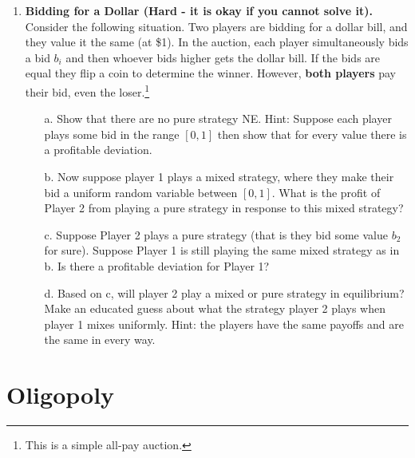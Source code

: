 \documentclass{article}
\begin{document}
\begin{enumerate}
\begin{enumerate}
        \vspace{4cm}
        
    \end{enumerate}
  \item \textbf{Bidding for a Dollar (Hard - it is okay if you cannot solve it).} Consider the following situation. Two players are bidding for a dollar bill, and they value it the same (at \$1). In the auction, each player simultaneously bids a bid $b_i$ and then whoever bids higher gets the dollar bill. If the bids are equal they flip a coin to determine the winner. However, \textbf{both players} pay their bid, even the loser.\footnote{This is a simple all-pay auction.}
  \begin{enumerate}
      \item[a.] Show that there are no pure strategy NE. Hint: Suppose each player plays some bid in the range $[0,1]$ then show that for every value there is a profitable deviation.
      
      \vspace{4cm}
      
      \item[b.] Now suppose player 1 plays a mixed strategy, where they make their bid a uniform random variable between $[0,1]$. What is the profit of Player 2 from playing a pure strategy in response to this mixed strategy?
      
      \vspace{4cm}
      
      \item[c.]  Suppose Player 2 plays a pure strategy (that is they bid some value $b_2$ for sure). Suppose Player 1 is still playing the same mixed strategy as in b. Is there a profitable deviation for Player 1?
      
      \vspace{4cm}
      
      \item[d.] Based on c, will player 2 play a mixed or pure strategy in equilibrium? Make an educated guess about what the strategy player 2 plays when player 1 mixes uniformly. Hint: the players have the same payoffs and are the same in every way.
      
      \vspace{4cm}
  \end{enumerate}
\end{enumerate}

\section{Oligopoly}
\end{document}
